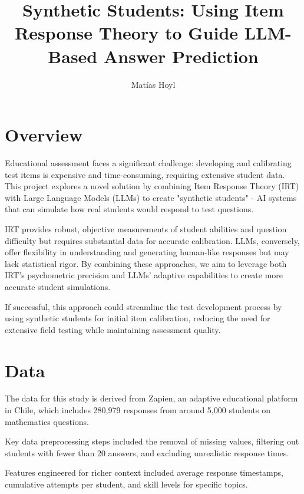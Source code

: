 \documentclass[
    a4paper, %
    10pt, %
    twoside %
]{LTJournalArticle}
\title{\Large Synthetic Students: Using Item Response Theory to Guide LLM-Based Answer Prediction}
\author{%
    Matías Hoyl
}
\begin{document}
\maketitle

\section{Overview}
Educational assessment faces a significant challenge: developing and calibrating test items is expensive and time-consuming, requiring extensive student data. This project explores a novel solution by combining Item Response Theory (IRT) with Large Language Models (LLMs) to create "synthetic students" - AI systems that can simulate how real students would respond to test questions.

IRT provides robust, objective measurements of student abilities and question difficulty but requires substantial data for accurate calibration. LLMs, conversely, offer flexibility in understanding and generating human-like responses but may lack statistical rigor. By combining these approaches, we aim to leverage both IRT's psychometric precision and LLMs' adaptive capabilities to create more accurate student simulations.

If successful, this approach could streamline the test development process by using synthetic students for initial item calibration, reducing the need for extensive field testing while maintaining assessment quality.

\section{Data}
The data for this study is derived from Zapien, an adaptive educational platform in Chile, which includes 280,979 responses from around 5,000 students on mathematics questions. 

Key data preprocessing steps included the removal of missing values, filtering out students with fewer than 20 answers, and excluding unrealistic response times. 

Features engineered for richer context included average response timestamps, cumulative attempts per student, and skill levels for specific topics. 
\end{document}
